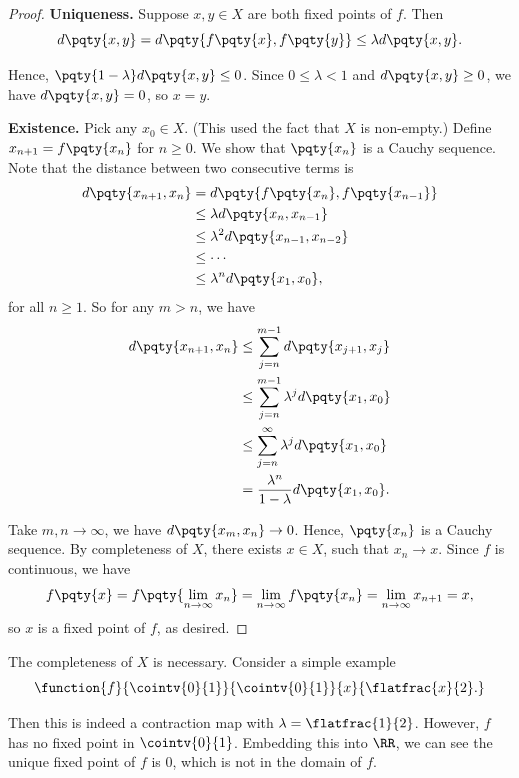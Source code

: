 \begin{proof}
    \textbf{Uniqueness.} Suppose \(x, y \in X\) are both fixed points of \(f\). Then
    \[
        d\pqty{x, y} = d\pqty{f\pqty{x}, f\pqty{y}} \leq \lambda d\pqty{x, y}.
    \]

    Hence, \(\pqty{1 - \lambda} d\pqty{x, y} \leq 0\). Since \(0 \leq \lambda < 1\) and \(d\pqty{x, y} \geq 0\), we have \(d\pqty{x, y} = 0\), so \(x = y\).

    \textbf{Existence.} Pick any \(x_0 \in X\). (This used the fact that \(X\) is non-empty.) Define \(x_{n + 1} = f\pqty{x_n}\) for \(n \geq 0\). We show that \(\pqty{x_n}\) is a Cauchy sequence. Note that the distance between two consecutive terms is
    \begin{align*}
        d\pqty{x_{n + 1}, x_n} &= d\pqty{f\pqty{x_n}, f\pqty{x_{n - 1}}} \\
        &\leq \lambda d\pqty{x_n, x_{n - 1}} \\
        &\leq \lambda^2 d\pqty{x_{n - 1}, x_{n - 2}} \\
        &\leq \cdots \\
        &\leq \lambda^n d\pqty{x_1, x_0},
    \end{align*}
    for all \(n \geq 1\). So for any \(m > n\), we have
    \begin{align}
        d\pqty{x_{n + 1}, x_n} &\leq \sum_{j = n}^{m - 1} d\pqty{x_{j + 1}, x_j} \\
        &\leq \sum_{j = n}^{m - 1} \lambda^j d\pqty{x_1, x_0} \\
        &\leq \sum_{j = n}^{\infty} \lambda^j d\pqty{x_1, x_0} \\
        &= \frac{\lambda^n}{1 - \lambda} d\pqty{x_1, x_0}.
    \end{align}

    Take \(m, n \to \infty\), we have \(d\pqty{x_m, x_n} \to 0\). Hence, \(\pqty{x_n}\) is a Cauchy sequence. By completeness of \(X\), there exists \(x \in X\), such that \(x_n \to x\). Since \(f\) is continuous, we have
    \[
        f\pqty{x} = f\pqty{\lim_{n \to \infty} x_n} = \lim_{n \to \infty} f\pqty{x_n} = \lim_{n \to \infty} x_{n + 1} = x,
    \] 
    so \(x\) is a fixed point of \(f\), as desired.
\end{proof}

\begin{remark}
    The completeness of \(X\) is necessary. Consider a simple example
    \[
        \function{f}{\cointv{0}{1}}{\cointv{0}{1}}{x}{\flatfrac{x}{2}.}
    \]

    Then this is indeed a contraction map with \(\lambda = \flatfrac{1}{2}\). However, \(f\) has no fixed point in \(\cointv{0}{1}\). Embedding this into \(\RR\), we can see the unique fixed point of \(f\) is \(0\), which is not in the domain of \(f\).
\end{remark}

